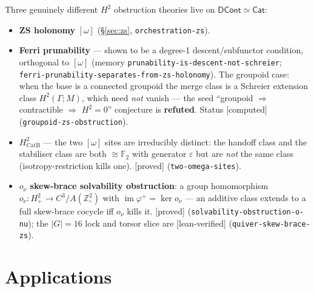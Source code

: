 \documentclass[11pt]{article}
\newcommand{\DCont}{\mathsf{DCont}}
\newcommand{\Cat}{\mathsf{Cat}}
\newcommand{\reg}[1]{\texttt{#1}}
\newcommand{\grade}[1]{\textsf{[#1]}}
\begin{document}
Three genuinely different $H^2$ obstruction theories live on $\DCont\simeq\Cat$:
\begin{itemize}[leftmargin=1.2em]
\item \textbf{ZS holonomy} $[\omega]$ (\S\ref{sec:zs}, \reg{orchestration-zs}).
\item \textbf{Ferri prunability} --- shown to be a degree-1 descent/subfunctor condition,
orthogonal to $[\omega]$ (memory \texttt{prunability-is-descent-not-schreier};
\texttt{ferri-prunability-separates-from-zs-holonomy}). The groupoid case: when the base is
a connected groupoid the merge class is a Schreier extension class $H^2(\Gamma;M)$, which
need \emph{not} vanish --- the seed ``groupoid $\Rightarrow$ contractible $\Rightarrow$
$H^2=0$'' conjecture is \textbf{refuted}. Status \grade{computed}
(\reg{groupoid-zs-obstruction}).
\item \textbf{$H^2_{\mathrm{CatB}}$} --- the two $[\omega]$ sites are irreducibly distinct:
the handoff class and the stabiliser class are both $\cong\mathbb{F}_2$ with generator
$\varepsilon$ but are \emph{not} the same class (isotropy-restriction kills one).
\grade{proved} (\reg{two-omega-sites}).
\item \textbf{$o_\nu$ skew-brace solvability obstruction}: a group homomorphism
$o_\nu:H^2_+\to C^3/A(\mathbb{Z}^2_\circ)$ with
$\operatorname{im}\varphi^+=\ker o_\nu$ --- an additive class extends to a full skew-brace
cocycle iff $o_\nu$ kills it. \grade{proved} (\reg{solvability-obstruction-o-nu}); the
$|G|=16$ lock and torsor slice are \grade{lean-verified} (\reg{quiver-skew-brace-zs}).
\end{itemize}

\section{Applications}\label{sec:apps}
\end{document}
